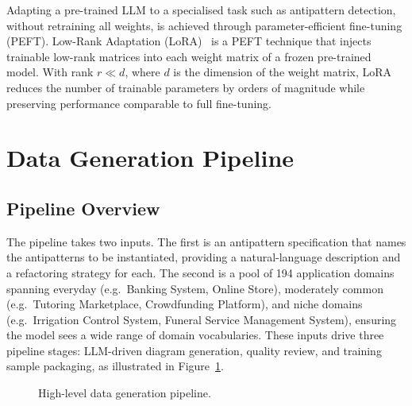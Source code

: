 \documentclass[sigconf,review,anonymous]{acmart}
\begin{document}
Adapting a pre-trained LLM to a specialised task such as antipattern detection,
without retraining all weights, is achieved through parameter-efficient fine-tuning (PEFT).
Low-Rank Adaptation (LoRA)~\cite{hu2022lora} is a PEFT technique that injects trainable low-rank matrices into each
weight matrix of a frozen pre-trained model.  With rank $r \ll d$, where $d$
is the dimension of the weight matrix, LoRA reduces the number of trainable parameters
by orders of magnitude while preserving performance comparable to full
fine-tuning.

\section{Data Generation Pipeline}
\label{sec:pipeline}

\subsection{Pipeline Overview}

The pipeline takes two inputs.  The first is an antipattern specification
that names the antipatterns to be instantiated, providing a natural-language
description and a refactoring strategy for each.  The second is a pool of
194 application domains spanning everyday (e.g.\ Banking System, Online
Store), moderately common (e.g.\ Tutoring Marketplace, Crowdfunding
Platform), and niche domains (e.g.\ Irrigation Control System, Funeral
Service Management System), ensuring the model sees a wide
range of domain vocabularies.  These inputs drive three pipeline stages:
LLM-driven diagram generation, quality review, and
training sample packaging, as illustrated in Figure~\ref{fig:pipeline}.

\begin{figure}[h]
\centering
{}
\caption{High-level data generation pipeline.}
\label{fig:pipeline}
\end{figure}
\end{document}
